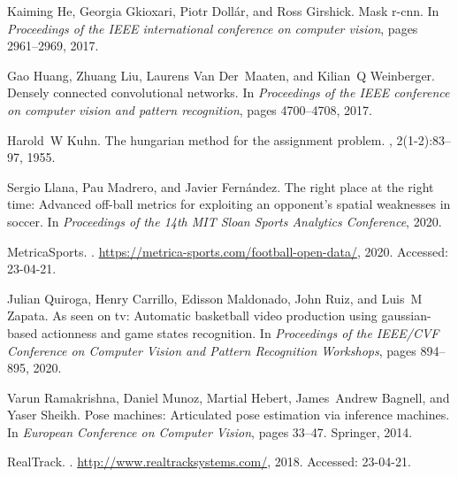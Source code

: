 \documentclass{article}
\begin{document}
\begin{thebibliography}{}
Kaiming He, Georgia Gkioxari, Piotr Doll{\'a}r, and Ross Girshick.
\newblock Mask r-cnn.
\newblock In {\em Proceedings of the IEEE international conference on computer
  vision}, pages 2961--2969, 2017.

Gao Huang, Zhuang Liu, Laurens Van Der~Maaten, and Kilian~Q Weinberger.
\newblock Densely connected convolutional networks.
\newblock In {\em Proceedings of the IEEE conference on computer vision and
  pattern recognition}, pages 4700--4708, 2017.

Harold~W Kuhn.
\newblock The hungarian method for the assignment problem.
, 2(1-2):83--97, 1955.

Sergio Llana, Pau Madrero, and Javier Fern{\'a}ndez.
\newblock The right place at the right time: Advanced off-ball metrics for
  exploiting an opponent’s spatial weaknesses in soccer.
\newblock In {\em Proceedings of the 14th MIT Sloan Sports Analytics
  Conference}, 2020.

MetricaSports.
.
\newblock \url{https://metrica-sports.com/football-open-data/}, 2020.
\newblock Accessed: 23-04-21.

Julian Quiroga, Henry Carrillo, Edisson Maldonado, John Ruiz, and Luis~M
  Zapata.
\newblock As seen on tv: Automatic basketball video production using
  gaussian-based actionness and game states recognition.
\newblock In {\em Proceedings of the IEEE/CVF Conference on Computer Vision and
  Pattern Recognition Workshops}, pages 894--895, 2020.

Varun Ramakrishna, Daniel Munoz, Martial Hebert, James~Andrew Bagnell, and
  Yaser Sheikh.
\newblock Pose machines: Articulated pose estimation via inference machines.
\newblock In {\em European Conference on Computer Vision}, pages 33--47.
  Springer, 2014.

RealTrack.
.
\newblock \url{http://www.realtracksystems.com/}, 2018.
\newblock Accessed: 23-04-21.


\end{thebibliography}
\end{document}
